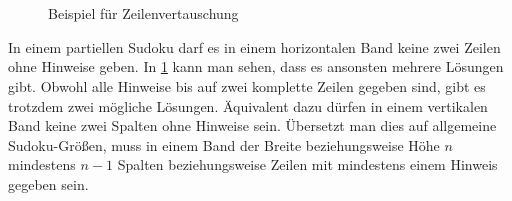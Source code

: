 \begin{figure}[H]
\begin{minipage}{0.48\textwidth}
        \\
        \\

    \end{minipage}
    \caption{Beispiel für Zeilenvertauschung}
    \label{fig:row_constraints}
\end{figure}

In einem partiellen Sudoku darf es in einem horizontalen Band keine zwei Zeilen ohne Hinweise geben.
In \cref{fig:row_constraints} kann man sehen, dass es ansonsten mehrere Lösungen gibt.
Obwohl alle Hinweise bis auf zwei komplette Zeilen gegeben sind, gibt es trotzdem zwei mögliche Lösungen.
Äquivalent dazu dürfen in einem vertikalen Band keine zwei Spalten ohne Hinweise sein.
Übersetzt man dies auf allgemeine Sudoku-Größen,
muss in einem Band der Breite beziehungsweise Höhe $n$ mindestens $n-1$ Spalten beziehungsweise Zeilen mit mindestens einem Hinweis gegeben sein.

